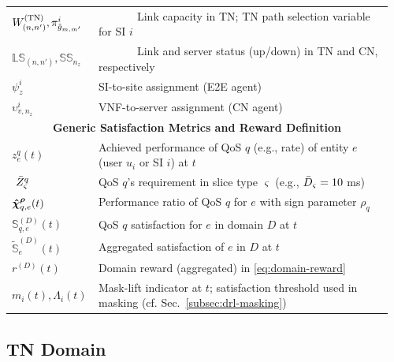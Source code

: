 \documentclass[12pt,lettersize,journal,onecolumn]{IEEEtran}
\begin{document}
\begin{table}[htbp]
\begin{tabular}{@{}p{0.192\linewidth}p{0.77\linewidth}@{}}
    $W^{\text{(TN)}}_{(n,n')}, \pi_{\Hat{g}_{m,m'}}^{i}$ & ~~~~~~~Link capacity in TN; TN path selection variable for SI $i$ \\
    $\mathbb{LS}_{(n,n')}, \mathbb{SS}_{n_z}$ & ~~~~~~~Link and server status (up/down) in TN and CN, respectively \\
    ${\psi}^{i}_{z}$ & SI-to-site assignment (E2E agent) \\
    ${\upsilon}^{i}_{v,n_z}$ & VNF-to-server assignment (CN agent) \\
    \midrule
    \multicolumn{2}{c}{\textbf{Generic Satisfaction Metrics and Reward Definition}} \\
    \midrule
    $z^{q}_{e}(t)$ & Achieved performance of QoS $q$ (e.g., rate) of entity $e$ (user $u_{i}$ or SI $i$) at $t$ \\
    $\,\,\Bar{Z}^{q}_{\varsigma}$ & QoS $q$'s requirement in slice type $\varsigma$ (e.g., $\Bar{D}_{\varsigma}=10$ ms) \\
    $\boldsymbol{\Hat{\chi}}^{\boldsymbol{\rho}}_{q,e}(t)$ & Performance ratio of QoS $q$ for $e$ with sign parameter $\rho_q$ \\
    $\mathbb{S}^{(D)}_{q,e}(t)$ & QoS $q$ satisfaction for $e$ in domain $D$ at $t$ \\
    $\tilde{\mathbb{S}}^{(D)}_{e}(t)$ & Aggregated satisfaction of $e$ in $D$ at $t$ \\
    $r^{(D)}(t)$ & Domain reward (aggregated) in \eqref{eq:domain-reward} \\
    $m_i(t), \Lambda_i(t)$ & Mask-lift indicator at $t$; satisfaction threshold used in masking (cf. Sec.~\ref{subsec:drl-masking})\\
    \bottomrule
\end{tabular}
\end{table}

\subsection{TN Domain} \label{tn-domain-section}
\end{document}

